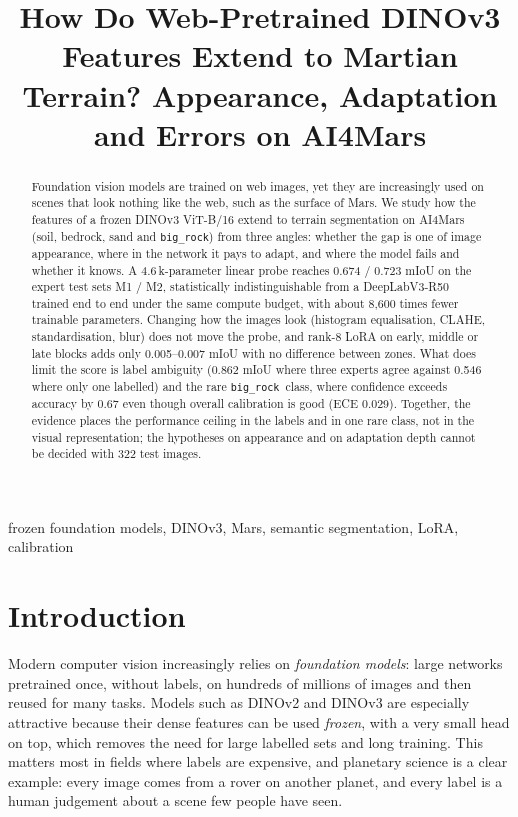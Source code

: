 \documentclass[conference]{IEEEtran}
\title{How Do Web-Pretrained DINOv3 Features Extend to Martian Terrain? Appearance, Adaptation and Errors on AI4Mars}
\author{\IEEEauthorblockN{Gonzalo Quispe}\IEEEauthorblockA{Pontificia Universidad Cat\'olica del Per\'u\\Lima, Peru\\gquispeo@pucp.edu.pe}
\and
\IEEEauthorblockN{Gustavo Meza}\IEEEauthorblockA{Pontificia Universidad Cat\'olica del Per\'u\\Lima, Peru\\meza.gustavo@pucp.edu.pe}
\and
\IEEEauthorblockN{David Rodr\'iguez}\IEEEauthorblockA{Pontificia Universidad Cat\'olica del Per\'u\\Lima, Peru\\david.rodriguezc@pucp.edu.pe}}
\newcommand{\bigrock}{\texttt{big\_rock}}
\begin{document}
\maketitle
\begin{abstract}
Foundation vision models are trained on web images, yet they are increasingly used on scenes that look nothing like the web, such as the surface of Mars. We study how the features of a frozen DINOv3 ViT-B/16 extend to terrain segmentation on AI4Mars (soil, bedrock, sand and \bigrock) from three angles: whether the gap is one of image appearance, where in the network it pays to adapt, and where the model fails and whether it knows. A 4.6\,k-parameter linear probe reaches 0.674 / 0.723 mIoU on the expert test sets M1 / M2, statistically indistinguishable from a DeepLabV3-R50 trained end to end under the same compute budget, with about 8{,}600 times fewer trainable parameters. Changing how the images look (histogram equalisation, CLAHE, standardisation, blur) does not move the probe, and rank-8 LoRA on early, middle or late blocks adds only 0.005--0.007 mIoU with no difference between zones. What does limit the score is label ambiguity (0.862 mIoU where three experts agree against 0.546 where only one labelled) and the rare \bigrock\ class, where confidence exceeds accuracy by 0.67 even though overall calibration is good (ECE 0.029). Together, the evidence places the performance ceiling in the labels and in one rare class, not in the visual representation; the hypotheses on appearance and on adaptation depth cannot be decided with 322 test images.
\end{abstract}

\begin{IEEEkeywords}frozen foundation models, DINOv3, Mars, semantic segmentation, LoRA, calibration\end{IEEEkeywords}
\section{Introduction}
Modern computer vision increasingly relies on \emph{foundation models}: large networks pretrained once, without labels, on hundreds of millions of images and then reused for many tasks. Models such as DINOv2 and DINOv3 \cite{oquab2023dinov2,simeoni2025dinov3} are especially attractive because their dense features can be used \emph{frozen}, with a very small head on top, which removes the need for large labelled sets and long training. This matters most in fields where labels are expensive, and planetary science is a clear example: every image comes from a rover on another planet, and every label is a human judgement about a scene few people have seen.
\end{document}
